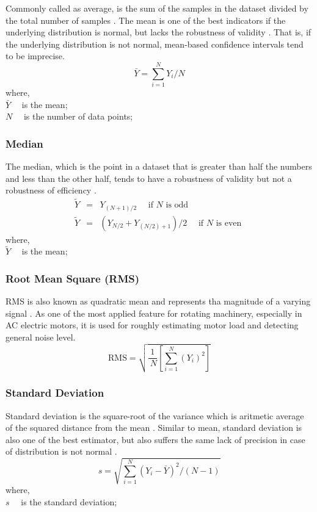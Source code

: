 Commonly called as average, is the sum of the samples in the dataset divided by the total number of samples \cite{shukla2015analysis}. The mean is one of the best indicators if the underlying distribution is normal, but lacks the robustness of validity \cite{croarkin2012handbook}. That is, if the underlying distribution is not normal, mean-based confidence intervals tend to be imprecise.
\begin{equation}
\bar{Y}=\sum_{i=1}^{N} Y_{i} / N
\label{mean}
\end{equation}
where,\\
$\bar{Y} \quad$ is the mean;\\
$N \quad$ is the number of data points;
\subsubsection{Median}

The median, which is the point in a dataset that is greater than half the numbers and less than the other half, tends to have a robustness of validity but not a robustness of efficiency \cite{croarkin2012handbook,shukla2015analysis}.
\begin{eqnarray}
\tilde{Y} &=& Y_{(N+1) / 2} \quad \text { if } N \text { is odd }\\
\tilde{Y} &=& \left(Y_{N / 2}+Y_{(N / 2)+1}\right) / 2 \quad \text { if } N \text { is even }
\label{median}
\end{eqnarray}
where,\\
$\tilde{Y} \quad$ is the mean;
\subsubsection{Root Mean Square (RMS)}

RMS is also known as quadratic mean and represents tha magnitude of a varying signal \cite{sait2011review,shukla2015analysis}. As one of the most applied feature for rotating machinery, especially in AC electric motors, it is used for roughly estimating motor load and detecting general noise level.
\begin{equation}
\text{RMS}=\sqrt{\frac{1}{{~N}}\left[\sum_{{i}=1}^{{N}}\left({Y}_{{i}}\right)^{2}\right]}	
\label{RMS}
\end{equation}
\subsubsection{Standard Deviation}

Standard deviation is the square-root of the variance which is aritmetic average of the squared distance from the mean \cite{shukla2015analysis}. Similar to mean, standard deviation is also one of the best estimator, but also suffers the same lack of precision in case of distribution is not normal \cite{croarkin2012handbook}.
\begin{equation}
s=\sqrt{\sum_{i=1}^{N}\left(Y_{i}-\bar{Y}\right)^{2} /(N-1)}
\label{std}
\end{equation}
where,\\
$s \quad$ is the standard deviation;\\
